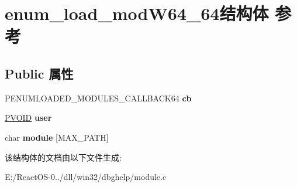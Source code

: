 \hypertarget{structenum__load__mod_w64__64}{}\section{enum\+\_\+load\+\_\+mod\+W64\+\_\+64结构体 参考}
\label{structenum__load__mod_w64__64}
\subsection*{Public 属性}
\begin{DoxyCompactItemize}
\item 
\mbox{\label{structenum__load__mod_w64__64_abd419044caa2e6aa6f15c140190afecd}} 
P\+E\+N\+U\+M\+L\+O\+A\+D\+E\+D\+\_\+\+M\+O\+D\+U\+L\+E\+S\+\_\+\+C\+A\+L\+L\+B\+A\+C\+K64 {\bfseries cb}
\item 
\mbox{\label{structenum__load__mod_w64__64_a57246cebd9b97a759af14a95c9981746}} 
\hyperlink{interfacevoid}{P\+V\+O\+ID} {\bfseries user}
\item 
\mbox{\label{structenum__load__mod_w64__64_a6c57de50cc906687b1205a7821a37c8b}} 
char {\bfseries module} \mbox{[}M\+A\+X\+\_\+\+P\+A\+TH\mbox{]}
\end{DoxyCompactItemize}


该结构体的文档由以下文件生成\+:\begin{DoxyCompactItemize}
\item 
E\+:/\+React\+O\+S-\/0../dll/win32/dbghelp/module.\+c\end{DoxyCompactItemize}

